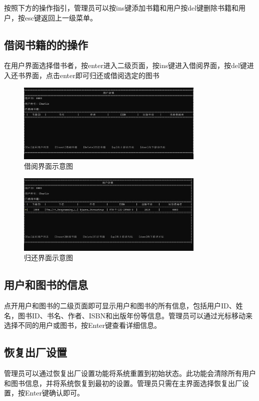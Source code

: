 \documentclass{article}
\begin{document}
按照下方的操作指引，管理员可以按ins键添加书籍和用户按del键删除书籍和用户，按esc键返回上一级菜单。
\subsection{借阅书籍的的操作}

在用户界面选择借书者，按enter进入二级页面，按ins键进入借阅界面，按del键进入还书界面，点击enter即可归还或借阅选定的图书

\begin{figure}[H]
    \centering
    \includegraphics[width=0.8\textwidth]{borrow.png}
    \caption{借阅界面示意图}
\end{figure}

\begin{figure}[H]
    \centering
    \includegraphics[width=0.8\textwidth]{manipulate.png}
    \caption{归还界面示意图}
\end{figure}

\subsection{用户和图书的信息}
点开用户和图书的二级页面即可显示用户和图书的所有信息，包括用户ID、姓名，图书ID、书名、作者、ISBN和出版年份等信息。管理员可以通过光标移动来选择不同的用户或图书，按Enter键查看详细信息。
\subsection{恢复出厂设置}
管理员可以通过恢复出厂设置功能将系统重置到初始状态。此功能会清除所有用户和图书信息，并将系统恢复到最初的设置。管理员只需在主界面选择恢复出厂设置，按Enter键确认即可。
\end{document}
